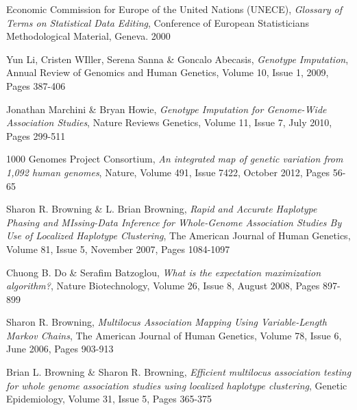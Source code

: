 \documentclass[a4paper,11pt,twoside,abstraction,titlepage]{article}
\begin{document}
\begin{thebibliography}{99}

 Economic Commission for Europe of the United Nations (UNECE), \emph{Glossary of Terms on Statistical Data Editing}, Conference of European Statisticians Methodological Material, Geneva. 2000

 Yun Li, Cristen WIller, Serena Sanna \& Goncalo Abecasis, \emph{Genotype Imputation}, Annual Review of Genomics and Human Genetics, Volume 10, Issue 1,  2009, Pages 387-406

 Jonathan Marchini \& Bryan Howie, \emph{Genotype Imputation for Genome-Wide Association Studies}, Nature Reviews Genetics, Volume 11, Issue 7, July 2010, Pages 299-511

 1000 Genomes Project Consortium, \emph{An integrated map of genetic variation from 1,092 human genomes}, Nature, Volume 491, Issue 7422, October 2012, Pages 56-65

 Sharon R. Browning \& L. Brian Browning, \emph{Rapid and Accurate Haplotype Phasing and MIssing-Data Inference for Whole-Genome Association Studies By Use of Localized Haplotype Clustering}, The American Journal of Human Genetics, Volume 81, Issue 5, November 2007, Pages 1084-1097

 Chuong B. Do \& Serafim Batzoglou, \emph{What is the expectation maximization algorithm?}, Nature Biotechnology, Volume 26, Issue 8, August 2008, Pages 897-899

 Sharon R. Browning, \emph{Multilocus Association Mapping Using Variable-Length Markov Chains}, The American Journal of Human Genetics, Volume 78, Issue 6, June 2006, Pages 903-913

 Brian L. Browning \& Sharon R. Browning, \emph{Efficient multilocus association testing for whole genome association studies using localized haplotype clustering},  Genetic Epidemiology, Volume 31, Issue 5, Pages 365-375




\end{thebibliography}
\end{document}

